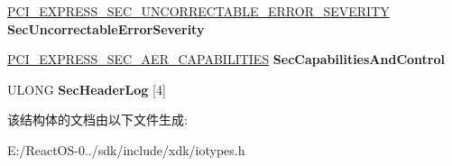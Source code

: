 \begin{DoxyCompactItemize}
\hyperlink{union___p_c_i___e_x_p_r_e_s_s___s_e_c___u_n_c_o_r_r_e_c_t_a_b_l_e___e_r_r_o_r___s_e_v_e_r_i_t_y}{P\+C\+I\+\_\+\+E\+X\+P\+R\+E\+S\+S\+\_\+\+S\+E\+C\+\_\+\+U\+N\+C\+O\+R\+R\+E\+C\+T\+A\+B\+L\+E\+\_\+\+E\+R\+R\+O\+R\+\_\+\+S\+E\+V\+E\+R\+I\+TY} {\bfseries Sec\+Uncorrectable\+Error\+Severity}
\item 
\mbox{\label{struct___p_c_i___e_x_p_r_e_s_s___b_r_i_d_g_e___a_e_r___c_a_p_a_b_i_l_i_t_y_aa0831d84c9a608affb064a46dedd6765}} 
\hyperlink{union___p_c_i___e_x_p_r_e_s_s___s_e_c___a_e_r___c_a_p_a_b_i_l_i_t_i_e_s}{P\+C\+I\+\_\+\+E\+X\+P\+R\+E\+S\+S\+\_\+\+S\+E\+C\+\_\+\+A\+E\+R\+\_\+\+C\+A\+P\+A\+B\+I\+L\+I\+T\+I\+ES} {\bfseries Sec\+Capabilities\+And\+Control}
\item 
\mbox{\label{struct___p_c_i___e_x_p_r_e_s_s___b_r_i_d_g_e___a_e_r___c_a_p_a_b_i_l_i_t_y_abe150f9e5e48ae8d62c33ce327433ece}} 
U\+L\+O\+NG {\bfseries Sec\+Header\+Log} \mbox{[}4\mbox{]}
\end{DoxyCompactItemize}


该结构体的文档由以下文件生成\+:\begin{DoxyCompactItemize}
\item 
E\+:/\+React\+O\+S-\/0../sdk/include/xdk/iotypes.\+h\end{DoxyCompactItemize}
